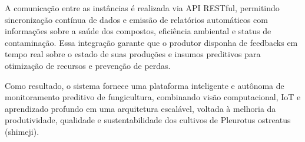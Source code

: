A comunicação entre as instâncias é realizada via API RESTful, permitindo sincronização contínua de dados e emissão de relatórios automáticos com informações sobre a saúde dos compostos, eficiência ambiental e status de contaminação. Essa integração garante que o produtor disponha de feedbacks em tempo real sobre o estado de suas produções e insumos preditivos para otimização de recursos e prevenção de perdas.

Como resultado, o sistema fornece uma plataforma inteligente e autônoma de monitoramento preditivo de fungicultura, combinando visão computacional, IoT e aprendizado profundo em uma arquitetura escalável, voltada à melhoria da produtividade, qualidade e sustentabilidade dos cultivos de Pleurotus ostreatus (shimeji).










